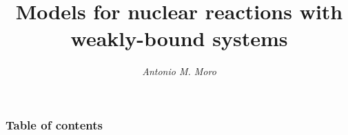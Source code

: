 \documentclass[english,10pt,compress]{beamer}
\title[International School of Physics Enrico Fermi, Varenna, 2017]%
  {Models for nuclear reactions with weakly-bound systems}
\author[A. M. Moro]{\emph{Antonio M. Moro} }
\date{}{}
\institute[Universidad de Sevilla, Spain]{
\texttt{[image: figs/logous.eps]} \\
{\color{ASUred} Universidad de Sevilla, Spain} \\
\vspace{0.5cm}
{\large \bf International School of Physics Enrico Fermi \\ Varenna, 14-19 July 2017} 
}
\begin{document}
\newcommand{\images}{figs}
\graphicspath{{./}{figs}}

\begin{frame}[plain]
	\titlepage
	\transboxout
\end{frame}

\begin{frame}[allowframebreaks]
  \frametitle{Table of contents}
  \tableofcontents
\end{frame}









%




%
\end{document}
